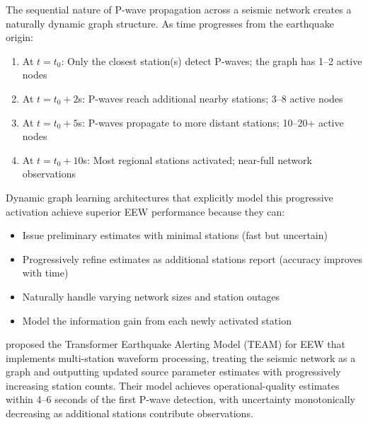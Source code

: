 \documentclass[review,authoryear]{elsarticle}
\begin{document}
The sequential nature of P-wave propagation across a seismic network creates a naturally dynamic graph structure. As time progresses from the earthquake origin:

\begin{enumerate}
  \item At $t = t_0$: Only the closest station(s) detect P-waves; the graph has 1--2 active nodes
  \item At $t = t_0 + 2$s: P-waves reach additional nearby stations; 3--8 active nodes
  \item At $t = t_0 + 5$s: P-waves propagate to more distant stations; 10--20+ active nodes
  \item At $t = t_0 + 10$s: Most regional stations activated; near-full network observations
\end{enumerate}

Dynamic graph learning architectures that explicitly model this progressive activation achieve superior EEW performance because they can:
\begin{itemize}
  \item Issue preliminary estimates with minimal stations (fast but uncertain)
  \item Progressively refine estimates as additional stations report (accuracy improves with time)
  \item Naturally handle varying network sizes and station outages
  \item Model the information gain from each newly activated station
\end{itemize}

\citet{munchmeyer2022team} proposed the Transformer Earthquake Alerting Model (TEAM) for EEW that implements multi-station waveform processing, treating the seismic network as a graph and outputting updated source parameter estimates with progressively increasing station counts. Their model achieves operational-quality estimates within 4--6 seconds of the first P-wave detection, with uncertainty monotonically decreasing as additional stations contribute observations.
\end{document}
